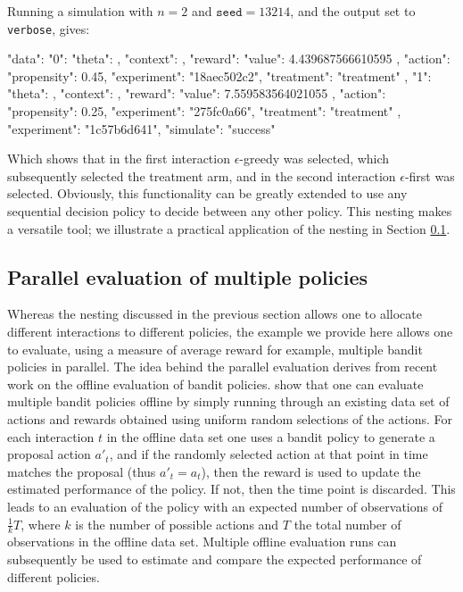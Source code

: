 \documentclass[nojss]{jss}
\begin{document}
Running a simulation with $n=2$ and $\texttt{seed}=13214$, and the output set to \texttt{verbose}, gives:
\begin{Code}
{
    "data": {
        "0": {
            "theta": {},
            "context": {},
            "reward": {
                "value": 4.439687566610595
            },
            "action": {
                "propensity": 0.45,
                "experiment": "18aec502c2",
                "treatment": "treatment"
            }
        },
        "1": {
            "theta": {},
            "context": {},
            "reward": {
                "value": 7.559583564021055
            },
            "action": {
                "propensity": 0.25,
                "experiment": "275fc0a66",
                "treatment": "treatment"
            }
        }
    },
    "experiment": "1c57b6d641",
    "simulate": "success"
}
\end{Code}
Which shows that in the first interaction $\epsilon$-greedy was selected, which subsequently selected the treatment arm, and in the second interaction $\epsilon$-first was selected. Obviously, this functionality can be greatly extended to use any sequential decision policy to decide between any other policy. This nesting makes  a versatile tool; we illustrate a practical application of the nesting in Section \ref{sec:offpol}.

\subsection{Parallel evaluation of multiple policies}
\label{sec:offpol}

Whereas the nesting discussed in the previous section allows one to allocate different interactions to different policies, the example we provide here allows one to evaluate, using a measure of average reward for example, multiple bandit policies in parallel. The idea behind the parallel evaluation derives from recent work on the offline evaluation of bandit policies. \citet{Li2010a} show that one can evaluate multiple bandit policies offline by simply running through an existing data set of actions and rewards obtained using uniform random selections of the actions. For each interaction $t$ in the offline data set one uses a bandit policy to generate a proposal action $a'_t$, and if the randomly selected action at that point in time matches the proposal (thus $a'_t = a_t$), then the reward is used to update the estimated performance of the policy. If not, then the time point is discarded. This leads to an evaluation of the policy with an expected number of observations of $\frac{1}{k} T$, where $k$ is the number of possible actions and $T$ the total number of observations in the offline data set. Multiple offline evaluation runs can subsequently be used to estimate and compare the expected performance of different policies.
\end{document}
